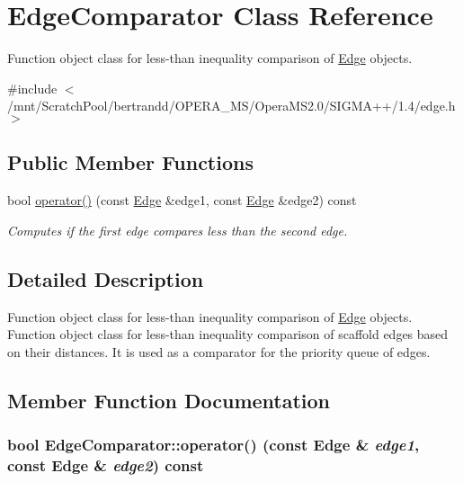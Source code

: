 \hypertarget{classEdgeComparator}{
\section{EdgeComparator Class Reference}
\label{classEdgeComparator}
}


Function object class for less-\/than inequality comparison of \hyperlink{classEdge}{Edge} objects.  


{\ttfamily \#include $<$/mnt/ScratchPool/bertrandd/OPERA\_\-MS/OperaMS2.0/SIGMA++/1.4/edge.h$>$}\subsection*{Public Member Functions}
\begin{DoxyCompactItemize}
\item 
bool \hyperlink{classEdgeComparator_afbaf589ea30c37ec90302f68d67e2a6d}{operator()} (const \hyperlink{classEdge}{Edge} \&edge1, const \hyperlink{classEdge}{Edge} \&edge2) const 
\begin{DoxyCompactList}\small\item\em Computes if the first edge compares less than the second edge. \item\end{DoxyCompactList}\end{DoxyCompactItemize}


\subsection{Detailed Description}
Function object class for less-\/than inequality comparison of \hyperlink{classEdge}{Edge} objects. Function object class for less-\/than inequality comparison of scaffold edges based on their distances. It is used as a comparator for the priority queue of edges. 

\subsection{Member Function Documentation}
\hypertarget{classEdgeComparator_afbaf589ea30c37ec90302f68d67e2a6d}{
\subsubsection[{operator()}]{\setlength{\rightskip}{0pt plus 5cm}bool EdgeComparator::operator() (const {\bf Edge} \& {\em edge1}, \/  const {\bf Edge} \& {\em edge2}) const}}
\label{classEdgeComparator_afbaf589ea30c37ec90302f68d67e2a6d}


